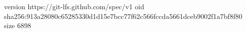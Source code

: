 version https://git-lfs.github.com/spec/v1
oid sha256:913a28080c65285330d1d15e7bcc77f62c566fccda5661dceb9002f1a7bf8f80
size 6898
